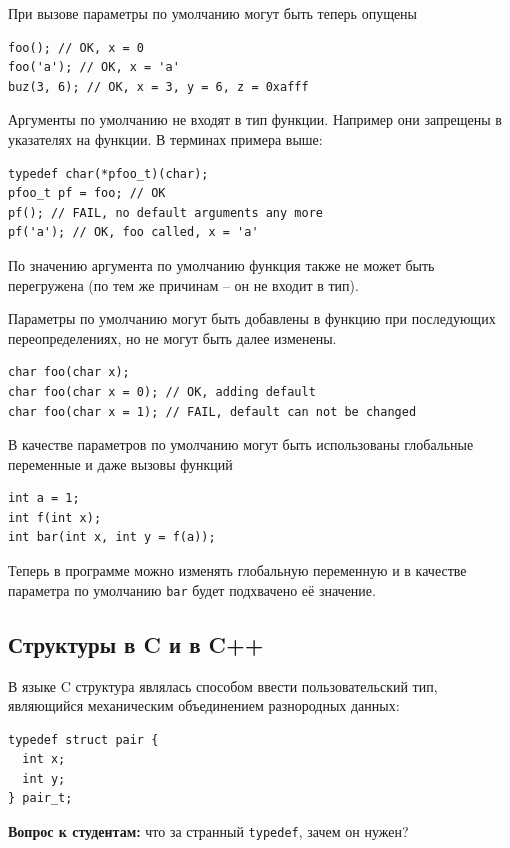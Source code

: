 \documentclass[a4paper,12pt,oneside]{book}
\begin{document}
При вызове параметры по умолчанию могут быть теперь опущены

\begin{lstlisting}
foo(); // OK, x = 0
foo('a'); // OK, x = 'a'
buz(3, 6); // OK, x = 3, y = 6, z = 0xafff
\end{lstlisting}

Аргументы по умолчанию не входят в тип функции. Например они запрещены в указателях на функции. В терминах примера выше:

\begin{lstlisting}
typedef char(*pfoo_t)(char);
pfoo_t pf = foo; // OK
pf(); // FAIL, no default arguments any more
pf('a'); // OK, foo called, x = 'a'
\end{lstlisting}

По значению аргумента по умолчанию функция также не может быть перегружена (по тем же причинам -- он не входит в тип).

Параметры по умолчанию могут быть добавлены в функцию при последующих переопределениях, но не могут быть далее изменены.

\begin{lstlisting}
char foo(char x);
char foo(char x = 0); // OK, adding default
char foo(char x = 1); // FAIL, default can not be changed
\end{lstlisting}

В качестве параметров по умолчанию могут быть использованы глобальные переменные и даже вызовы функций

\begin{lstlisting}
int a = 1;
int f(int x);
int bar(int x, int y = f(a));
\end{lstlisting}

Теперь в программе можно изменять глобальную переменную и в качестве параметра по умолчанию \lstinline!bar! будет подхвачено её значение.

\subsection{Структуры в C и в C++}\label{CCppStructs}

В языке C структура являлась способом ввести пользовательский тип, являющийся механическим объединением разнородных данных:

\begin{lstlisting}
typedef struct pair { 
  int x; 
  int y; 
} pair_t;
\end{lstlisting}

\textbf{Вопрос к студентам:} что за странный \lstinline!typedef!, зачем он нужен?
\end{document}
